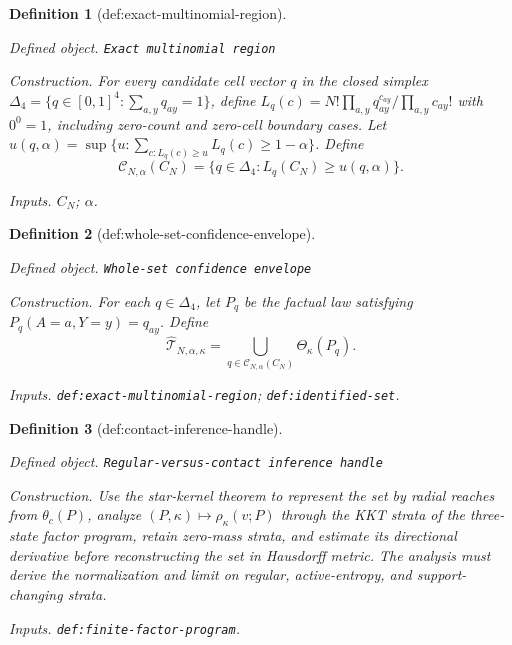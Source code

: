 \documentclass{article}
\newtheorem{definition}{Definition}
\begin{document}
\begin{definition}[def:exact-multinomial-region]\label{def:exact-multinomial-region}
\par\smallskip\noindent\emph{Defined object.} \texttt{Exact multinomial region}
\par\smallskip\noindent\emph{Construction.} For every candidate cell vector \(q\) in the closed simplex \(\Delta_4=\{q\in[0,1]^4:\sum_{a,y}q_{ay}=1\}\), define \(L_q(c)=N!\prod_{a,y}q_{ay}^{c_{ay}}/\prod_{a,y}c_{ay}!\) with \(0^0=1\), including zero-count and zero-cell boundary cases. Let \(u(q,\alpha)=\sup\{u:\sum_{c:L_q(c)\geq u}L_q(c)\geq1-\alpha\}\). Define \[\mathcal C_{N,\alpha}(C_N)=\{q\in\Delta_4:L_q(C_N)\geq u(q,\alpha)\}.\]
\par\smallskip\noindent\emph{Inputs.} \(C_N\); \(\alpha\).
\end{definition}

\begin{definition}[def:whole-set-confidence-envelope]\label{def:whole-set-confidence-envelope}
\par\smallskip\noindent\emph{Defined object.} \texttt{Whole-\allowbreak{}set confidence envelope}
\par\smallskip\noindent\emph{Construction.} For each \(q\in\Delta_4\), let \(P_q\) be the factual law satisfying \(P_q(A=a,Y=y)=q_{ay}\). Define
\[\widehat{\mathcal T}_{N,\alpha,\kappa}=\bigcup_{q\in\mathcal C_{N,\alpha}(C_N)}\Theta_\kappa(P_q).\]
\par\smallskip\noindent\emph{Inputs.} \texttt{def:\allowbreak{}exact-\allowbreak{}multinomial-\allowbreak{}region}; \texttt{def:\allowbreak{}identified-\allowbreak{}set}.
\end{definition}

\begin{definition}[def:contact-inference-handle]\label{def:contact-inference-handle}
\par\smallskip\noindent\emph{Defined object.} \texttt{Regular-\allowbreak{}versus-\allowbreak{}contact inference handle}
\par\smallskip\noindent\emph{Construction.} Use the star-kernel theorem to represent the set by radial reaches from \(\theta_c(P)\), analyze \((P,\kappa)\mapsto\rho_\kappa(v;P)\) through the KKT strata of the three-state factor program, retain zero-mass strata, and estimate its directional derivative before reconstructing the set in Hausdorff metric. The analysis must derive the normalization and limit on regular, active-entropy, and support-changing strata.
\par\smallskip\noindent\emph{Inputs.} \texttt{def:\allowbreak{}finite-\allowbreak{}factor-\allowbreak{}program}.
\end{definition}
\end{document}
